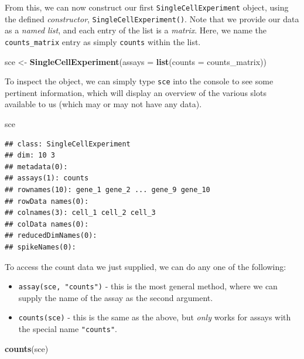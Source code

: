 \documentclass[]{book}
\newenvironment{Shaded}{\begin{snugshade}}{\end{snugshade}}
\newcommand{\DataTypeTok}[1]{\textcolor[rgb]{0.13,0.29,0.53}{#1}}
\newcommand{\KeywordTok}[1]{\textcolor[rgb]{0.13,0.29,0.53}{\textbf{#1}}}
\newcommand{\NormalTok}[1]{#1}
\newcommand{\StringTok}[1]{\textcolor[rgb]{0.31,0.60,0.02}{#1}}
\providecommand{\tightlist}{%
  \setlength{\itemsep}{0pt}\setlength{\parskip}{0pt}}
\begin{document}
From this, we can now construct our first \texttt{SingleCellExperiment} object, using the defined \emph{constructor}, \texttt{SingleCellExperiment()}. Note that we provide our data as a \emph{named} \emph{list}, and each entry of the list is a \emph{matrix}. Here, we name the \texttt{counts\_matrix} entry as simply \texttt{counts} within the list.

\begin{Shaded}
\begin{Highlighting}[]
\NormalTok{sce <-}\StringTok{ }\KeywordTok{SingleCellExperiment}\NormalTok{(}\DataTypeTok{assays =} \KeywordTok{list}\NormalTok{(}\DataTypeTok{counts =}\NormalTok{ counts_matrix))}
\end{Highlighting}
\end{Shaded}

To inspect the object, we can simply type \texttt{sce} into the console to see some pertinent information, which will display an overview of the various slots available to us (which may or may not have any data).

\begin{Shaded}
\begin{Highlighting}[]
\NormalTok{sce}
\end{Highlighting}
\end{Shaded}

\begin{verbatim}
## class: SingleCellExperiment 
## dim: 10 3 
## metadata(0):
## assays(1): counts
## rownames(10): gene_1 gene_2 ... gene_9 gene_10
## rowData names(0):
## colnames(3): cell_1 cell_2 cell_3
## colData names(0):
## reducedDimNames(0):
## spikeNames(0):
\end{verbatim}

To access the count data we just supplied, we can do any one of the following:

\begin{itemize}
\tightlist
\item
  \texttt{assay(sce,\ "counts")} - this is the most general method, where we can supply the name of the assay as the second argument.
\item
  \texttt{counts(sce)} - this is the same as the above, but \emph{only} works for assays with the special name \texttt{"counts"}.
\end{itemize}

\begin{Shaded}
\begin{Highlighting}[]
\KeywordTok{counts}\NormalTok{(sce)}
\end{Highlighting}
\end{Shaded}
\end{document}
